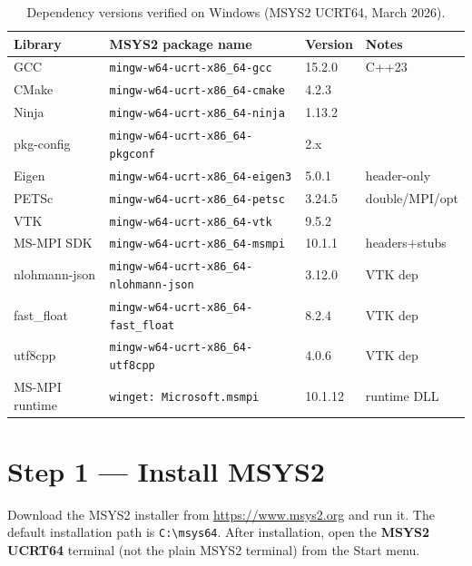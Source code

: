 \begin{table}[ht]
  \centering
  \caption{Dependency versions verified on Windows (MSYS2 UCRT64, March 2026).}
  \label{tab:win-deps}
  \begin{tabular}{llll}
    \toprule
    Library & MSYS2 package name & Version & Notes \\
    \midrule
    GCC           & \texttt{mingw-w64-ucrt-x86\_64-gcc}          & 15.2.0   & C++23 \\
    CMake         & \texttt{mingw-w64-ucrt-x86\_64-cmake}         & 4.2.3    & \\
    Ninja         & \texttt{mingw-w64-ucrt-x86\_64-ninja}         & 1.13.2   & \\
    pkg-config    & \texttt{mingw-w64-ucrt-x86\_64-pkgconf}       & 2.x      & \\
    Eigen         & \texttt{mingw-w64-ucrt-x86\_64-eigen3}        & 5.0.1    & header-only \\
    PETSc         & \texttt{mingw-w64-ucrt-x86\_64-petsc}         & 3.24.5   & double/MPI/opt \\
    VTK           & \texttt{mingw-w64-ucrt-x86\_64-vtk}           & 9.5.2    & \\
    MS-MPI SDK    & \texttt{mingw-w64-ucrt-x86\_64-msmpi}         & 10.1.1   & headers+stubs \\
    nlohmann-json & \texttt{mingw-w64-ucrt-x86\_64-nlohmann-json} & 3.12.0   & VTK dep \\
    fast\_float   & \texttt{mingw-w64-ucrt-x86\_64-fast\_float}   & 8.2.4    & VTK dep \\
    utf8cpp       & \texttt{mingw-w64-ucrt-x86\_64-utf8cpp}       & 4.0.6    & VTK dep \\
    MS-MPI runtime & \texttt{winget: Microsoft.msmpi}             & 10.1.12  & runtime DLL \\
    \bottomrule
  \end{tabular}
\end{table}

\section{Step 1 — Install MSYS2}
\label{sec:win-msys2}

Download the MSYS2 installer from \url{https://www.msys2.org} and run it.
The default installation path is \texttt{C:\textbackslash msys64}.
After installation, open the \textbf{MSYS2 UCRT64} terminal (not the plain
MSYS2 terminal) from the Start menu.


